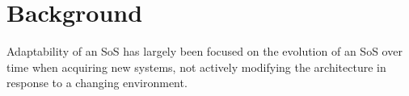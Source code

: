 \section{Background}

Adaptability of an SoS has largely been focused on the evolution of an SoS over time when acquiring new systems, not actively modifying the architecture in response to a changing environment. 